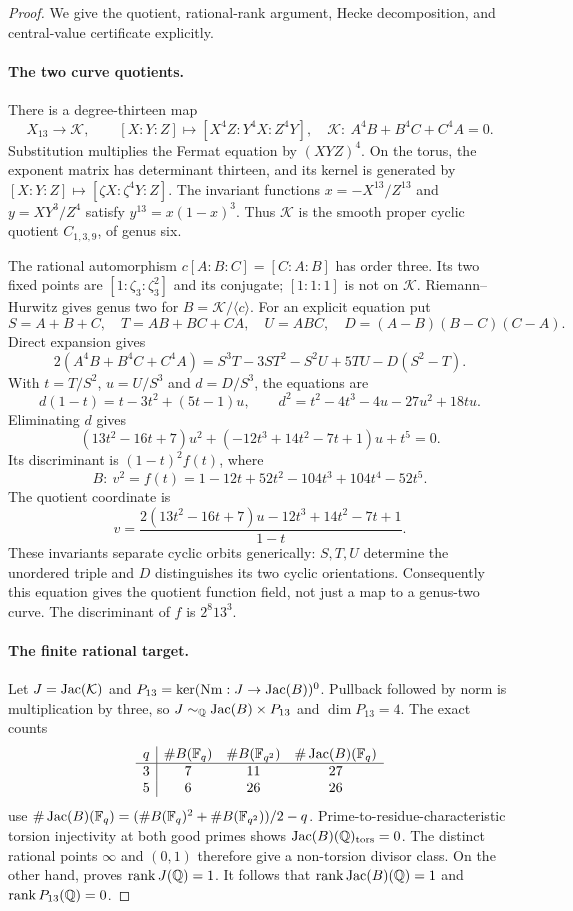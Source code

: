 \begin{proof}
We give the quotient, rational-rank argument, Hecke decomposition,
and central-value certificate explicitly.

\paragraph{The two curve quotients.}
There is a degree-thirteen map
\[
 X_{13}\longrightarrow\mathcal K,
 \qquad [X:Y:Z]\longmapsto[X^4Z:Y^4X:Z^4Y],
 \quad\mathcal K:\ A^4B+B^4C+C^4A=0.
\]
Substitution multiplies the Fermat equation by $(XYZ)^4$.
On the torus, the exponent matrix has determinant thirteen, and its
kernel is generated by $[X:Y:Z]\mapsto[\zeta X:\zeta^4Y:Z]$.
The invariant functions
$x=-X^{13}/Z^{13}$ and $y=XY^3/Z^4$ satisfy
$y^{13}=x(1-x)^3$. Thus $\mathcal K$ is the smooth proper cyclic
quotient $C_{1,3,9}$, of genus six.

The rational automorphism $c[A:B:C]=[C:A:B]$ has order three.
Its two fixed points are $[1:\zeta_3:\zeta_3^2]$ and its conjugate;
$[1:1:1]$ is not on $\mathcal K$. Riemann--Hurwitz gives genus two
for $B=\mathcal K/\langle c\rangle$.
For an explicit equation put
\[
 S=A+B+C,\quad T=AB+BC+CA,\quad U=ABC,\quad
 D=(A-B)(B-C)(C-A).
\]
Direct expansion gives
\[
 2(A^4B+B^4C+C^4A)
 =S^3T-3ST^2-S^2U+5TU-D(S^2-T).
\]
With $t=T/S^2$, $u=U/S^3$ and $d=D/S^3$, the equations are
\[
 d(1-t)=t-3t^2+(5t-1)u,\qquad
 d^2=t^2-4t^3-4u-27u^2+18tu.
\]
Eliminating $d$ gives
\[
 (13t^2-16t+7)u^2+(-12t^3+14t^2-7t+1)u+t^5=0.
\]
Its discriminant is $(1-t)^2f(t)$, where
\[
 B:\ v^2=f(t)=1-12t+52t^2-104t^3+104t^4-52t^5.
\]
The quotient coordinate is
\[
 v=\frac{2(13t^2-16t+7)u-12t^3+14t^2-7t+1}{1-t}.
\]
These invariants separate cyclic orbits generically: $S,T,U$
determine the unordered triple and $D$ distinguishes its two
cyclic orientations. Consequently this equation gives the quotient
function field, not just a map to a genus-two curve.
The discriminant of $f$ is $2^8 13^3$.

\paragraph{The finite rational target.}
Let $J=\operatorname{Jac}(\mathcal K)$ and
$P_{13}=\ker(\operatorname{Nm}:J\to\operatorname{Jac}(B))^0$.
Pullback followed by norm is multiplication by three, so
$J\sim_\mathbb Q\operatorname{Jac}(B)\times P_{13}$ and $\dim P_{13}=4$.
The exact counts
\[
 \begin{array}{c|ccc}
 q&\#B(\mathbb F_q)&\#B(\mathbb F_{q^2})&\#\operatorname{Jac}(B)(\mathbb F_q)\\\hline
 3&7&11&27\\
 5&6&26&26
 \end{array}
\]
use $\#\operatorname{Jac}(B)(\mathbb F_q)=(\#B(\mathbb F_q)^2+\#B(\mathbb F_{q^2}))/2-q$.
Prime-to-residue-characteristic torsion injectivity at both good
primes shows $\operatorname{Jac}(B)(\mathbb Q)_{\rm tors}=0$. The distinct rational
points $\infty$ and $(0,1)$ therefore give a non-torsion divisor
class. On the other hand,
\citet[\S4, table on p.~219]{GrossRohrlich1978} proves
$\operatorname{rank}J(\mathbb Q)=1$. It follows that
$\operatorname{rank}\operatorname{Jac}(B)(\mathbb Q)=1$ and
$\operatorname{rank}P_{13}(\mathbb Q)=0$.


\end{proof}
